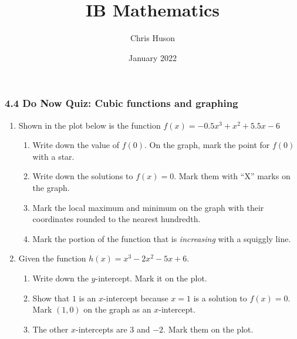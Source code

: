 \documentclass[12pt, twoside]{article}
\title{IB Mathematics}
\author{Chris Huson}
\date{January 2022}
\begin{document}
\subsubsection*{4.4 Do Now Quiz: Cubic functions and graphing}
\begin{enumerate}
\item Shown in the plot below is the function $f(x)=-0.5x^{3}+x^{2}+5.5x-6$
\begin{enumerate}
    \item Write down the value of $f(0)$. On the graph, mark the point for $f(0)$ with a star.\vspace{1cm}
    \item Write down the solutions to $f(x)=0$. Mark them with ``X'' marks on the graph.\vspace{1cm}
    \item Mark the local maximum and minimum on the graph with their coordinates rounded to the nearest hundredth.
    \item Mark the portion of the function that is \emph{increasing} with a squiggly line.
\end{enumerate}
\begin{center}
\end{center}

\newpage
\item Given the function $h(x)=x^3-2x^2-5x+6$.
    \begin{enumerate}
        \item Write down the $y$-intercept. Mark it on the plot.
        \item Show that $1$ is an $x$-intercept because $x=1$ is a solution to $f(x)=0$. Mark $(1, 0)$ on the graph as an $x$-intercept.\vspace{2cm}
        \item The other $x$-intercepts are $3$ and $-2$. Mark them on the plot.
    

\end{enumerate}
\end{enumerate}
\end{document}
